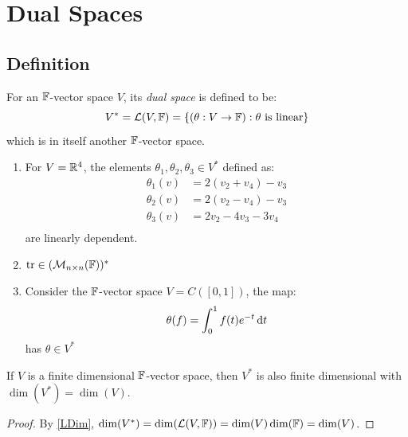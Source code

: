 \documentclass[../main.tex]{subfiles}
\begin{document}
\chapter{Dual Spaces}
\section{Definition}
\begin{definition}
  For an $\mathbb{F}$-vector space $V$, its \textit{dual space} is defined to be:
  \[
    V^{*} = \mathcal{L}(V, \mathbb{F}) = \{(\theta: V \to \mathbb{F}): \theta \text{ is linear}\}
  \]
  which is in itself another $\mathbb{F}$-vector space.
\end{definition}
\begin{example}
  \begin{enumerate}
    \item For $V = \mathbb{R}^{4}$, the elements $\theta_1, \theta_2, \theta_3 \in V^{*}$ defined as:
      \begin{align*}
        \theta_1(v) &= 2(v_2 + v_4) - v_3  \\
        \theta_2(v) &= 2(v_2 - v_4) - v_3  \\
        \theta_3(v) &= 2v_2 - 4v_3 - 3v_4  \\
      \end{align*}
      are linearly dependent.
    \item $\operatorname{tr} \in (\mathcal{M}_{n \times n}(\mathbb{F}))^{*}$
    \item Consider the $\mathbb{F}$-vector space $V = C([0, 1])$, the map:
      \[
        \theta(f) = \int_{0}^{1} f(t)e^{-t} \d{t}
      \]
      has $\theta \in V^{*}$
  \end{enumerate}
\end{example}
\begin{lemma}
  If $V$ is a finite dimensional $\mathbb{F}$-vector space, then $V^{*}$ is also finite dimensional with $\dim(V^{*}) = \dim(V)$. \label{dualSize}
\end{lemma}
\begin{proof}
  By \cref{LDim}, $\dim(V^{*}) = \dim(\mathcal{L}(V, \mathbb{F})) = \dim(V) \dim(\mathbb{F}) = \dim(V)$.
\end{proof}
\end{document}
